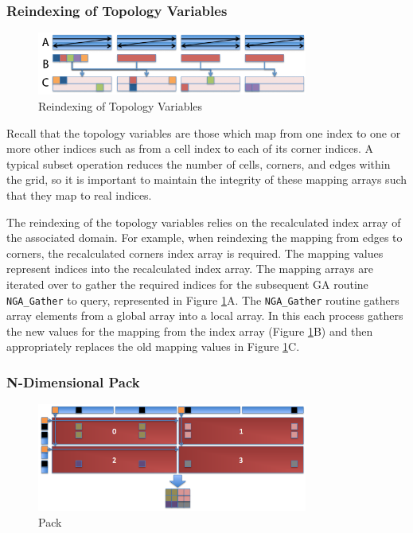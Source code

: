 \subsubsection{Reindexing of Topology Variables}

\begin{figure}[!t]
\center
\includegraphics[width=3.5in]{images/reindex_label}
\caption{Reindexing of Topology Variables}
\label{fig:reindex}
\end{figure}

Recall that the topology variables are those which map from one index to
one or more other indices such as from a cell index to each of its corner
indices.  A typical subset operation reduces the number of cells, corners, and
edges within the grid, so it is important to maintain the integrity of these
mapping arrays such that they map to real indices.

The reindexing of the topology variables relies on the recalculated index
array of the associated domain.  For example, when reindexing the mapping from
edges to corners, the recalculated corners index array is required.  The
mapping values represent indices into the recalculated index array.  The
mapping arrays are iterated over to gather the required indices for the
subsequent GA routine \verb=NGA_Gather= to query, represented in Figure
\ref{fig:reindex}A.  The \verb=NGA_Gather= routine gathers array elements from
a global array into a local array.  In this each process gathers the new
values for the mapping from the index array (Figure \ref{fig:reindex}B) and
then appropriately replaces the old mapping values in Figure
\ref{fig:reindex}C.

\subsubsection{N-Dimensional Pack}
\label{section:alg_pack}

\begin{figure}[!t]
\center
\includegraphics[width=3.5in]{images/pack}
\caption{Pack}
\label{fig:pack}
\end{figure}


